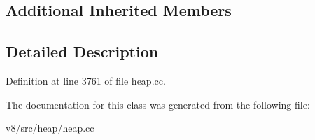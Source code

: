 \subsection*{Additional Inherited Members}


\subsection{Detailed Description}


Definition at line 3761 of file heap.\+cc.



The documentation for this class was generated from the following file\+:\begin{DoxyCompactItemize}
\item 
v8/src/heap/heap.\+cc\end{DoxyCompactItemize}
